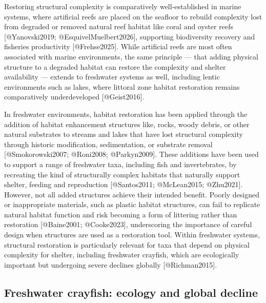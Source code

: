 \documentclass[
  letterpaper,
  DIV=11,
  numbers=noendperiod]{scrartcl}
\begin{document}
Restoring structural complexity is comparatively well-established in
marine systems, where artificial reefs are placed on the seafloor to
rebuild complexity lost from degraded or removed natural reef habitat
like coral and oyster reefs {[}@Yanovski2019; @EsquivelMuelbert2026{]},
supporting biodiversity recovery and fisheries productivity
{[}@Frehse2025{]}. While artificial reefs are most often associated with
marine environments, the same principle --- that adding physical
structure to a degraded habitat can restore the complexity and shelter
availability --- extends to freshwater systems as well, including lentic
environments such as lakes, where littoral zone habitat restoration
remains comparatively underdeveloped {[}@Geist2016{]}.

In freshwater environments, habitat restoration has been applied through
the addition of habitat enhancement structures like, rocks, woody
debris, or other natural substrates to streams and lakes that have lost
structural complexity through historic modification, sedimentation, or
substrate removal {[}@Smokorowski2007; @Roni2008; @Parkyn2009{]}. These
additions have been used to support a range of freshwater taxa,
including fish and invertebrates, by recreating the kind of structurally
complex habitats that naturally support shelter, feeding and
reproduction {[}@Santos2011; @McLean2015; @Zhu2021{]}. However, not all
added structures achieve their intended benefit. Poorly designed or
inappropriate materials, such as plastic habitat structures, can fail to
replicate natural habitat function and risk becoming a form of littering
rather than restoration {[}@Baine2001; @Cooke2023{]}, underscoring the
importance of careful design when structures are used as a restoration
tool. Within freshwater systems, structural restoration is particularly
relevant for taxa that depend on physical complexity for shelter,
including freshwater crayfish, which are ecologically important but
undergoing severe declines globally {[}@Richman2015{]}.

\subsection{Freshwater crayfish: ecology and global
decline}\label{freshwater-crayfish-ecology-and-global-decline}
\end{document}
